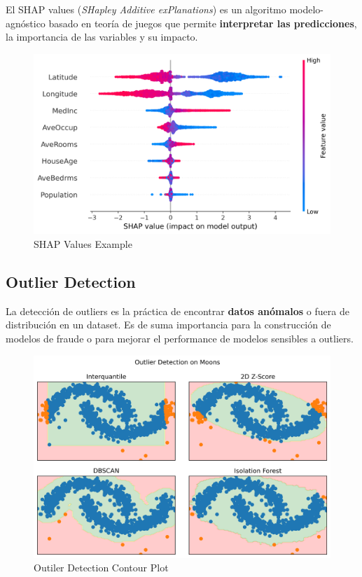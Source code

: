 El SHAP values (\textit{SHapley Additive exPlanations}) es un algoritmo modelo-agnóstico basado en teoría de juegos que permite \textbf{interpretar las predicciones}, la importancia de las variables y su impacto.

\begin{figure}[H]
    \center
    \includegraphics[scale=0.55]{notebooks/Others/img/shap_values_example.png}
    \caption{SHAP Values Example}
\end{figure}

\subsection{Outlier Detection}

La detección de outliers es la práctica de encontrar \textbf{datos anómalos} o fuera de distribución en un dataset. Es de suma importancia para la construcción de modelos de fraude o para mejorar el performance de modelos sensibles a outliers.

\begin{figure}[H]
    \center
    \includegraphics[scale=0.55]{notebooks/Others/img/outlier_detection.png}
    \caption{Outiler Detection Contour Plot}
\end{figure}

